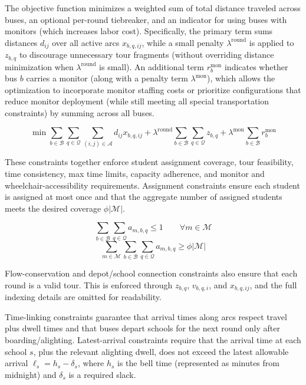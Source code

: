 The objective function minimizes a weighted sum of total distance traveled across buses, an optional per-round tiebreaker, and an indicator for using buses with monitors (which increases labor cost). Specifically, the primary term sums distances $d_{ij}$ over all active arcs $x_{b,q,ij}$, while a small penalty $\lambda^{\mathrm{round}}$ is applied to $z_{b,q}$ to discourage unnecessary tour fragments (without overriding distance minimization when $\lambda^{\mathrm{round}}$ is small). An additional term $r_b^{\mathrm{mon}}$ indicates whether bus $b$ carries a monitor (along with a penalty term $\lambda^{\mathrm{mon}}$), which allows the optimization to incorporate monitor staffing costs or prioritize configurations that reduce monitor deployment (while still meeting all special transportation constraints) by summing across all buses.

\[
\min{\sum_{b\in\mathcal{B}} \sum_{q\in\mathcal{Q}} \sum_{\left(i,j\right)\in\mathcal{A}} d_{ij} x_{b,q,ij} + \lambda^{\mathrm{round}} \sum_{b\in\mathcal{B}} \sum_{q\in\mathcal{Q}} z_{b,q} +\lambda^{\mathrm{mon}} \sum_{b\in\mathcal{B}} r_{b}^{\mathrm{mon}}}
\]

These constraints together enforce student assignment coverage, tour feasibility, time consistency, max time limits, capacity adherence, and monitor and wheelchair-accessibility requirements. Assignment constraints ensure each student is assigned at most once and that the aggregate number of assigned students meets the desired coverage $\phi\left\vert\mathcal{M}\right\vert$.

\[
\sum_{b\in\mathcal{B}} \sum_{q\in\mathcal{Q}} a_{m,b,q} \leq 1 \qquad \forall m\in\mathcal{M}
\]
\[
\sum_{m\in\mathcal{M}}\sum_{b\in\mathcal{B}} \sum_{q\in\mathcal{Q}} a_{m,b,q} \geq \phi\left\vert\mathcal{M}\right\vert
\]

Flow-conservation and depot/school connection constraints also ensure that each round is a valid tour. This is enforced through $z_{b,q}$, $v_{b,q,i}$, and $x_{b,q,ij}$, and the full indexing details are omitted for readability.

Time-linking constraints guarantee that arrival times along arcs respect travel plus dwell times and that buses depart schools for the next round only after boarding/alighting. Latest-arrival constraints require that the arrival time at each school $s$, plus the relevant alighting dwell, does not exceed the latest allowable arrival $\ell_s=h_s-\delta_s$, where $h_s$ is the bell time (represented as minutes from midnight) and $\delta_s$ is a required slack.

